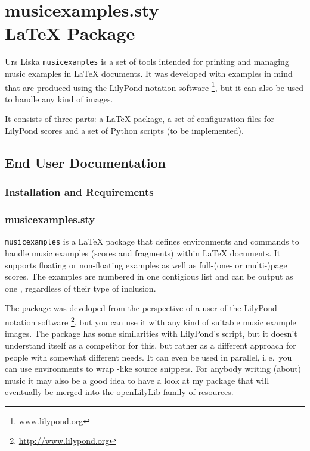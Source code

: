 \documentclass[../openLilyLib]{subfiles}
\begin{document}
\part{musicexamples.sty\\\LaTeX{} Package}


\begin{authorAbstract}{Urs Liska}
\texttt{musicexamples} is a set of tools intended for printing and managing music examples in \LaTeX{} documents.
It was developed with examples in mind that are produced using the LilyPond notation software%
\footnote{\url{www.lilypond.org}},
but it can also be used to handle any kind of images.

It consists of three parts: a \LaTeX{} package, a set of configuration files for LilyPond scores and a set of Python scripts (to be implemented).
\end{authorAbstract}

\vfill


\tableofcontents

\chapter{End User Documentation}
\section{Installation and Requirements}

\section{musicexamples.sty}
\label{sec:xmp_musicexamples}

\texttt{musicexamples} is a \LaTeX{} package that defines environments and commands to handle music examples (scores and fragments) within \LaTeX{} documents.
It supports floating or non-floating examples as well as full-(one- or multi-)page scores.
The examples are numbered in one contigious list and can be output as one , regardless of their type of inclusion.

The package was developed from the perspective of a user of the LilyPond notation software%
\footnote{\url{http://www.lilypond.org}}, but you can use it with any kind of suitable music example images.
The package has some similarities with LilyPond's  script, but it doesn't understand itself as a competitor for this, but rather as a different approach for people with somewhat different needs.
It can even be used in parallel, i.\,e.\ you can use  environments to wrap -like source snippets.
For anybody writing (about) music it may also be a good idea to have a look at my  package that will eventually be merged into the openLilyLib family of resources.
\end{document}
